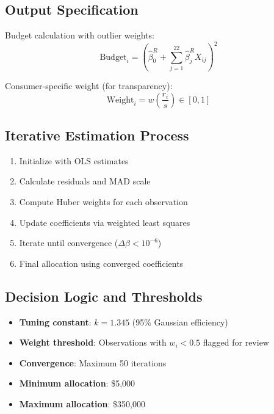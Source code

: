 \subsection{Output Specification}

Budget calculation with outlier weights:
\begin{equation}
\text{Budget}_i = \left(\hat{\beta}_0^R + \sum_{j=1}^{22} \hat{\beta}_j^R X_{ij}\right)^2
\end{equation}

Consumer-specific weight (for transparency):
\begin{equation}
\text{Weight}_i = w\left(\frac{r_i}{s}\right) \in [0, 1]
\end{equation}

\subsection{Iterative Estimation Process}

\begin{enumerate}
    \item Initialize with OLS estimates
    \item Calculate residuals and MAD scale
    \item Compute Huber weights for each observation
    \item Update coefficients via weighted least squares
    \item Iterate until convergence ($\Delta\beta < 10^{-6}$)
    \item Final allocation using converged coefficients
\end{enumerate}

\subsection{Decision Logic and Thresholds}

\begin{itemize}
    \item \textbf{Tuning constant}: $k = 1.345$ (95\% Gaussian efficiency)
    \item \textbf{Weight threshold}: Observations with $w_i < 0.5$ flagged for review
    \item \textbf{Convergence}: Maximum 50 iterations
    \item \textbf{Minimum allocation}: \$5,000
    \item \textbf{Maximum allocation}: \$350,000
\end{itemize}

